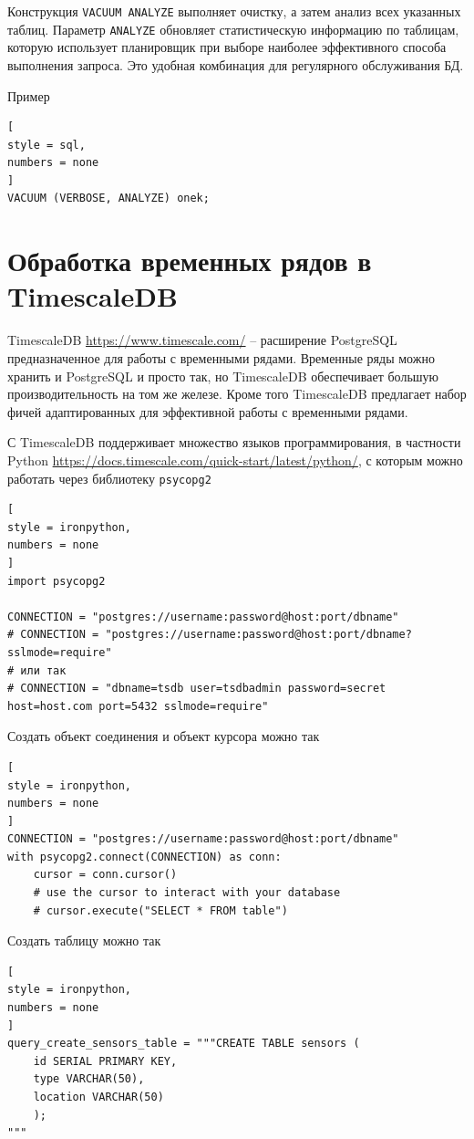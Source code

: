 \documentclass[%
	11pt,
	a4paper,
	utf8,
		]{article}
\begin{document}
Конструкция \texttt{VACUUM ANALYZE} выполняет очистку, а затем анализ всех указанных таблиц. Параметр \texttt{ANALYZE} обновляет статистическую информацию по таблицам, которую использует планировщик при выборе наиболее эффективного способа выполнения запроса. Это удобная комбинация для регулярного обслуживания БД.

Пример
\begin{lstlisting}[
style = sql,
numbers = none
]
VACUUM (VERBOSE, ANALYZE) onek;
\end{lstlisting}

\section{Обработка временных рядов в TimescaleDB}

TimescaleDB \url{https://www.timescale.com/} -- расширение PostgreSQL предназначенное для работы с временными рядами. Временные ряды можно хранить и PostgreSQL и просто так, но TimescaleDB обеспечивает большую производительность на том же железе. Кроме того TimescaleDB предлагает набор фичей адаптированных для эффективной работы с временными рядами.

С TimescaleDB поддерживает множество языков программирования, в частности Python \url{https://docs.timescale.com/quick-start/latest/python/}, с которым можно работать через библиотеку \verb|psycopg2|
\begin{lstlisting}[
style = ironpython,
numbers = none
]
import psycopg2

CONNECTION = "postgres://username:password@host:port/dbname"
# CONNECTION = "postgres://username:password@host:port/dbname?sslmode=require"
# или так
# CONNECTION = "dbname=tsdb user=tsdbadmin password=secret host=host.com port=5432 sslmode=require"
\end{lstlisting}

Создать объект соединения и объект курсора можно так
\begin{lstlisting}[
style = ironpython,
numbers = none
]
CONNECTION = "postgres://username:password@host:port/dbname"
with psycopg2.connect(CONNECTION) as conn:
	cursor = conn.cursor()
	# use the cursor to interact with your database
	# cursor.execute("SELECT * FROM table")
\end{lstlisting}

Создать таблицу можно так
\begin{lstlisting}[
style = ironpython,
numbers = none
]
query_create_sensors_table = """CREATE TABLE sensors (
	id SERIAL PRIMARY KEY,
	type VARCHAR(50),
	location VARCHAR(50)
	);
"""
\end{lstlisting}
\end{document}
